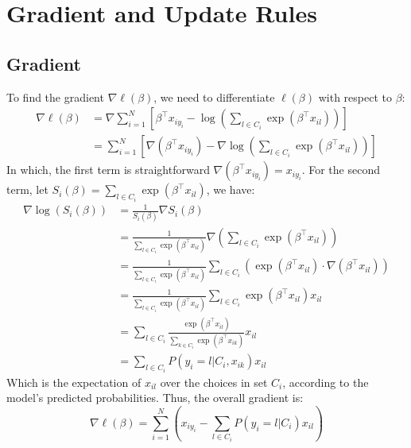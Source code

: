 \documentclass[11pt, a4paper, oneside]{memoir}
\begin{document}
\section{Gradient and Update Rules}
\subsection{Gradient}
To find the gradient $\nabla\ell(\beta)$, we need to differentiate $\ell(\beta)$ with respect to $\beta$:
\begin{align*}
  \nabla\ell(\beta) &= \nabla \sum_{i=1}^{N} \left[ \beta^\top x_{iy_i} - \log \left( \sum_{l \in C_i} \exp(\beta^\top x_{il}) \right) \right] \\
  &= \sum_{i=1}^{N} \left[ \nabla(\beta^\top x_{iy_i}) - \nabla \log \left( \sum_{l \in C_i} \exp(\beta^\top x_{il}) \right) \right]
\end{align*}
In which, the first term is straightforward $\nabla(\beta^\top x_{iy_i}) = x_{iy_i}$.
For the second term, let $S_i(\beta) = \sum_{l \in C_i} \exp(\beta^\top x_{il})$, we have:
\begin{align*}
  \nabla \log(S_i(\beta)) &= \frac{1}{S_i(\beta)} \nabla S_i(\beta) \\
  &= \frac{1}{\sum_{l \in C_i} \exp(\beta^\top x_{il})} \nabla \left( \sum_{l \in C_i} \exp(\beta^\top x_{il}) \right) \\
  &= \frac{1}{\sum_{l \in C_i} \exp(\beta^\top x_{il})} \sum_{l \in C_i} \left( \exp(\beta^\top x_{il}) \cdot \nabla(\beta^\top x_{il}) \right) \\
  &= \frac{1}{\sum_{l \in C_i} \exp(\beta^\top x_{il})} \sum_{l \in C_i} \exp(\beta^\top x_{il}) x_{il} \\
  &= \sum_{l \in C_i} \frac{\exp(\beta^\top x_{il})}{\sum_{k \in C_i} \exp(\beta^\top x_{ik})} x_{il} \\
  &= \sum_{l \in C_i} P(y_i = l | C_i, {x_{ik}}) x_{il}
\end{align*}
Which is the expectation of $x_{il}$ over the choices in set $C_i$, according to the model's predicted probabilities.
Thus, the overall gradient is:
\[ \nabla\ell(\beta) = \sum_{i=1}^{N} \left( x_{iy_i} - \sum_{l \in C_i} P(y_i = l | C_i) x_{il} \right) \]
\end{document}
